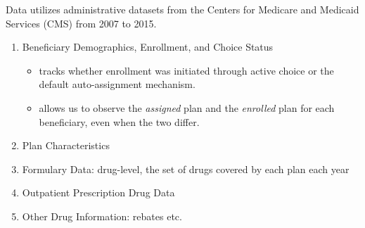 \begin{frame}{Data}
    utilizes administrative datasets from the Centers for Medicare and Medicaid Services (CMS) from 2007 to 2015.

    \begin{enumerate}
        \item Beneficiary Demographics, Enrollment, and Choice Status
        \begin{itemize}
            \item tracks whether enrollment was initiated through active choice or the default auto-assignment mechanism. 
            \item allows us to observe the \textit{assigned} plan and the \textit{enrolled} plan for each beneficiary, even when the two differ.
        \end{itemize}
        \item Plan Characteristics 
        \item Formulary Data: drug-level, the set of drugs covered by each plan each year 
        \item Outpatient Prescription Drug Data
        \item Other Drug Information: rebates etc.
    \end{enumerate}
\end{frame}